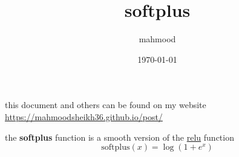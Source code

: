 \documentclass[a4paper,12pt]{article}
\author{mahmood}
\date{\today}
\title{softplus}
\begin{document}
\maketitle
\begin{note}
this document and others can be found on my website\\
\url{https://mahmoodsheikh36.github.io/post/}
\end{note}
the \textbf{softplus} function is a smooth version of the \href{20230503001319-relu.org}{relu} function\\
\[
\mathrm{softplus}(x) = \log(1+e^x)
\]
\end{document}
